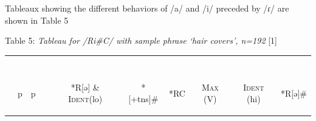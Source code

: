 \documentclass[output=paper,
modfonts
]{langscibook}
\begin{document}
Tableaux showing the different behaviors of /a/ and /i/ preceded by /ɾ/ are shown in Table 5 

\begin{center}Table 5: \textit{Tableau for /Ri\#C/ with sample phrase ‘hair covers’, n=192}
\renewcommand*\arraystretch{1.2}
\vspace{1.0cm} \scalebox{1}[1]{}{\begin{tabular}[t]{|l||c|c|c|c|c|c|c|c|c|} 
\hline
  & & & & & & & & &\\
 & & & & & & & & &\\
 & & & & & & & & & \\
  & & & & & & & & & \\
 & & & & & & &  & & \\
{\textipa{}} & \hspace*{0.1cm} p  \hspace*{0.2cm} & \hspace*{0.1cm} p  \hspace*{0.2cm} & \hspace*{0.1cm} \begin{rotate}{45} \end{rotate} \hspace*{0.2cm} & \hspace*{0.1cm} \begin{rotate}{90} *R[ə] \& \textsc{Ident}(lo)\end{rotate} \hspace*{0.1cm} & \hspace*{0.1cm} \begin{rotate}{90} *[+tns]\# \end{rotate} \hspace*{0.2cm} &  \hspace*{0.1cm} \begin{rotate}{90} *RC \end{rotate} \hspace*{0.2cm} & \hspace*{0.1cm} \begin{rotate}{90} \textsc{Max} (V) \end{rotate} \hspace*{0.2cm} & \hspace*{0.1cm} \begin{rotate}{90} \textsc{Ident} (hi) \end{rotate} \hspace{0.2cm} & \hspace*{0.1cm} \begin{rotate}{90} *R[ə]\# \end{rotate} \hspace*{0.2cm}\\[.5ex]


\end{tabular}}
\end{center}
\end{document}
